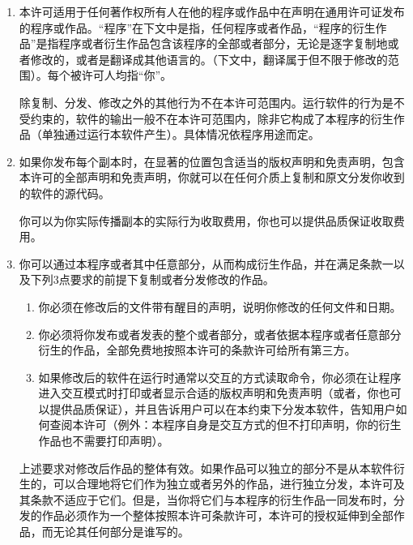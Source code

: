 \documentclass[11pt]{article}
\begin{document}
\begin{enumerate}

\addtocounter{enumi}{-1}

\item 

本许可适用于任何著作权所有人在他的程序或作品中在声明在通用许可证发布的程序或作品。“程序”在下文中是指，任何程序或者作品，“程序的衍生作品”是指程序或者衍生作品包含该程序的全部或者部分，无论是逐字复制地或者修改的，或者是翻译成其他语言的。（下文中，翻译属于但不限于修改的范围）。每个被许可人均指“你”。

除复制、分发、修改之外的其他行为不在本许可范围内。运行软件的行为是不受约束的，软件的输出一般不在本许可范围内，除非它构成了本程序的衍生作品（单独通过运行本软件产生）。具体情况依程序用途而定。

\item 如果你发布每个副本时，在显著的位置包含适当的版权声明和免责声明，包含本许可的全部声明和免责声明，你就可以在任何介质上复制和原文分发你收到的软件的源代码。

你可以为你实际传播副本的实际行为收取费用，你也可以提供品质保证收取费用。

\item

你可以通过本程序或者其中任意部分，从而构成衍生作品，并在满足条款一以及下列3点要求的前提下复制或者分发修改的作品。

\begin{enumerate}

\item 

你必须在修改后的文件带有醒目的声明，说明你修改的任何文件和日期。

\item

你必须将你发布或者发表的整个或者部分，或者依据本程序或者任意部分衍生的作品，全部免费地按照本许可的条款许可给所有第三方。

\item
如果修改后的软件在运行时通常以交互的方式读取命令，你必须在让程序进入交互模式时打印或者显示合适的版权声明和免责声明（或者，你也可以提供品质保证），并且告诉用户可以在本约束下分发本软件，告知用户如何查阅本许可（例外：本程序自身是交互方式的但不打印声明，你的衍生作品也不需要打印声明）。

\end{enumerate}


上述要求对修改后作品的整体有效。如果作品可以独立的部分不是从本软件衍生的，可以合理地将它们作为独立或者另外的作品，进行独立分发，本许可及其条款不适应于它们。但是，当你将它们与本程序的衍生作品一同发布时，分发的作品必须作为一个整体按照本许可条款许可，本许可的授权延伸到全部作品，而无论其任何部分是谁写的。



\end{enumerate}
\end{document}
